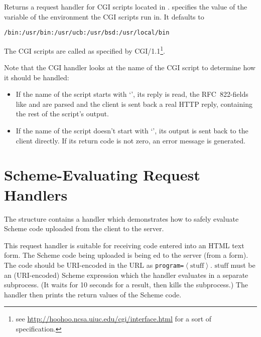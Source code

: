\begin{desc}
  Returns a request handler for CGI scripts located in
  .   specifies the value of the
   variable of the environment the CGI scripts run in. It defaults
  to
\begin{verbatim}
/bin:/usr/bin:/usr/ucb:/usr/bsd:/usr/local/bin
\end{verbatim}
  The CGI scripts are called as specified by CGI/1.1\footnote{see
    \url{http://hoohoo.ncsa.uiuc.edu/cgi/interface.html} for a sort of
    specification.}.

  Note that the CGI handler looks at the name of the CGI script to
  determine how it should be handled:
  \begin{itemize}
  \item If the name of the script starts with `', its reply
    is read, the RFC~822-fields like  and 
    are parsed and the client is sent back a real HTTP reply,
    containing the rest of the script's output.
    
  \item If the name of the script doesn't start with `',
    its output is sent back to the client directly. If its return code
    is not zero, an error message is generated.
\end{itemize}
\end{desc}      

\section{Scheme-Evaluating Request Handlers}

The  structure contains a handler which
demonstrates how to safely evaluate Scheme code uploaded from the
client to the server.

\begin{desc}
  This request handler is suitable for receiving code entered into an
  HTML text form. The Scheme code being uploaded is being ed
  to the server (from a form).  The code should be URI-encoded in the
  URL as \texttt{program=}$\left<\mathrm{stuff}\right>$.
  $\mathrm{stuff}$ must be an (URI-encoded) Scheme expression which
  the handler evaluates in a separate subprocess.  (It waits for 10
  seconds for a result, then kills the subprocess.)  The handler then
  prints the return values of the Scheme code.
\end{desc}

